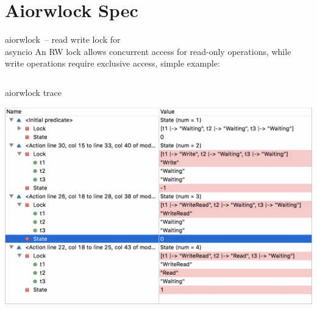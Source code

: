 \documentclass[12pt]{beamer}
\begin{document}
  \section{Aiorwlock Spec}
  \begin{frame}[fragile]{aiorwlock~-- read write lock for \\ asyncio}
      An RW lock allows concurrent access for read-only operations,
      while write operations require exclusive access, simple example:
      \inputminted[linenos,fontsize=\scriptsize]{python}{figures/lock.py}
  \end{frame}
  \begin{frame}{aiorwlock trace}
      \begin{center}
          \includegraphics[scale=0.50]{figures/tla_trace}
      \end{center}
  \end{frame}
\end{document}
